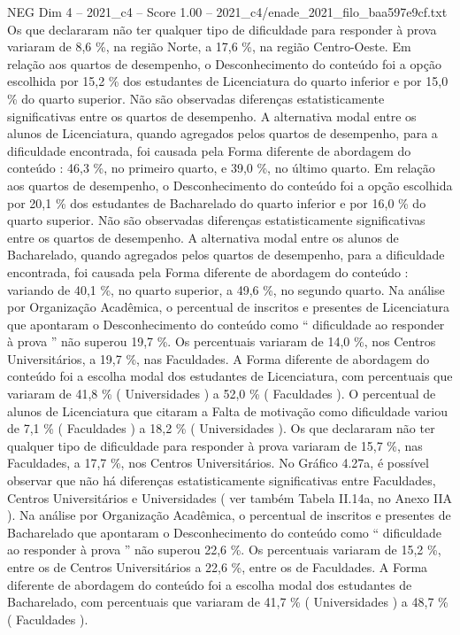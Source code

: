 \begin{textsample}{NEG Dim 4 – 2021\_c4 – Score 1.00 – 2021\_c4/enade\_2021\_filo\_baa597e9cf.txt}
Os que declararam não ter qualquer tipo de dificuldade para responder à prova variaram de 8,6 \%, na região Norte, a 17,6 \%, na região Centro-Oeste.
Em relação aos quartos de desempenho, o Desconhecimento do conteúdo foi a opção escolhida por 15,2 \% dos estudantes de Licenciatura do quarto inferior e por 15,0 \% do quarto superior.
Não são observadas diferenças estatisticamente significativas entre os quartos de desempenho.
A alternativa modal entre os alunos de Licenciatura, quando agregados pelos quartos de desempenho, para a dificuldade encontrada, foi causada pela Forma diferente de abordagem do conteúdo : 46,3 \%, no primeiro quarto, e 39,0 \%, no último quarto.
Em relação aos quartos de desempenho, o Desconhecimento do conteúdo foi a opção escolhida por 20,1 \% dos estudantes de Bacharelado do quarto inferior e por 16,0 \% do quarto superior.
Não são observadas diferenças estatisticamente significativas entre os quartos de desempenho.
A alternativa modal entre os alunos de Bacharelado, quando agregados pelos quartos de desempenho, para a dificuldade encontrada, foi causada pela Forma diferente de abordagem do conteúdo : variando de 40,1 \%, no quarto superior, a 49,6 \%, no segundo quarto.
Na análise por Organização Acadêmica, o percentual de inscritos e presentes de Licenciatura que apontaram o Desconhecimento do conteúdo como “ dificuldade ao responder à prova ” não superou 19,7 \%.
Os percentuais variaram de 14,0 \%, nos Centros Universitários, a 19,7 \%, nas Faculdades.
A Forma diferente de abordagem do conteúdo foi a escolha modal dos estudantes de Licenciatura, com percentuais que variaram de 41,8 \% ( Universidades ) a 52,0 \% ( Faculdades ).
O percentual de alunos de Licenciatura que citaram a Falta de motivação como dificuldade variou de 7,1 \% ( Faculdades ) a 18,2 \% ( Universidades ).
Os que declararam não ter qualquer tipo de dificuldade para responder à prova variaram de 15,7 \%, nas Faculdades, a 17,7 \%, nos Centros Universitários.
No Gráfico 4.27a, é possível observar que não há diferenças estatisticamente significativas entre Faculdades, Centros Universitários e Universidades ( ver também Tabela II.14a, no Anexo IIA ).
Na análise por Organização Acadêmica, o percentual de inscritos e presentes de Bacharelado que apontaram o Desconhecimento do conteúdo como “ dificuldade ao responder à prova ” não superou 22,6 \%.
Os percentuais variaram de 15,2 \%, entre os de Centros Universitários a 22,6 \%, entre os de Faculdades.
A Forma diferente de abordagem do conteúdo foi a escolha modal dos estudantes de Bacharelado, com percentuais que variaram de 41,7 \% ( Universidades ) a 48,7 \% ( Faculdades ).

\end{textsample}
